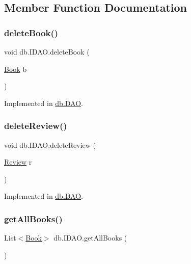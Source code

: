 \subsection{Member Function Documentation}
\mbox{\label{interfacedb_1_1_i_d_a_o_a1d6c98ea794177d7fd12c4a028ec29c1}} 
\subsubsection{\texorpdfstring{delete\+Book()}{deleteBook()}}
{\footnotesize\ttfamily void db.\+I\+D\+A\+O.\+delete\+Book (\begin{DoxyParamCaption}\item[{\hyperlink{classserver_1_1data_1_1_book}{Book}}]{b }\end{DoxyParamCaption})}



Implemented in \hyperlink{classdb_1_1_d_a_o_a65f6a816c5f6dfb07178daf490f56fdc}{db.\+D\+AO}.

\mbox{\label{interfacedb_1_1_i_d_a_o_a78ca80bc2f2b660edeb9eddd8ca9a4b7}} 
\subsubsection{\texorpdfstring{delete\+Review()}{deleteReview()}}
{\footnotesize\ttfamily void db.\+I\+D\+A\+O.\+delete\+Review (\begin{DoxyParamCaption}\item[{\hyperlink{classserver_1_1data_1_1_review}{Review}}]{r }\end{DoxyParamCaption})}



Implemented in \hyperlink{classdb_1_1_d_a_o_aa033f83155deb72d59492bcb2b8e4d3a}{db.\+D\+AO}.

\mbox{\label{interfacedb_1_1_i_d_a_o_a75a5ebcd7c3421ae7cccc8e2f3b2d9f9}} 
\subsubsection{\texorpdfstring{get\+All\+Books()}{getAllBooks()}}
{\footnotesize\ttfamily List$<$\hyperlink{classserver_1_1data_1_1_book}{Book}$>$ db.\+I\+D\+A\+O.\+get\+All\+Books (\begin{DoxyParamCaption}{ }\end{DoxyParamCaption})}



